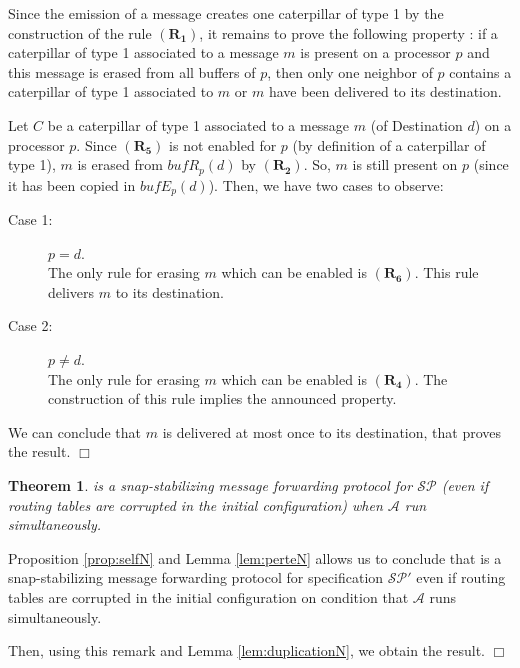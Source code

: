 \documentclass[11pt]{article}
\newtheorem{theorem}{Theorem}
\newenvironment{proof}{{\noindent\bf Proof. } }{{\hfill $\Box$}}
\begin{document}
\begin{proof}
Since the emission of a message creates one caterpillar of type 1 by the construction of the rule $\boldsymbol{(R_{1})}$, it remains to prove the following property : if a caterpillar of type 1 associated to a message $m$ is present on a processor $p$ and this message is erased from all buffers of $p$, then only one neighbor of $p$ contains a caterpillar of type 1 associated to $m$ or $m$ have been delivered to its destination.

Let $C$ be a caterpillar of type 1 associated to a message $m$ (of Destination $d$) on a processor $p$. Since $\boldsymbol{(R_{5})}$ is not enabled for $p$ (by definition of a caterpillar of type 1), $m$ is erased from $bufR_{p}(d)$ by $\boldsymbol{(R_{2})}$. So, $m$ is still present on $p$ (since it has been copied in $bufE_{p}(d)$). Then, we have two cases to observe:

\begin{description}
\item [Case 1:] $p=d$.\\
The only rule for erasing $m$ which can be enabled is $\boldsymbol{(R_{6})}$. This rule delivers $m$ to its destination.
\item [Case 2:] $p\neq d$.\\
The only rule for erasing $m$ which can be enabled is $\boldsymbol{(R_{4})}$. The construction of this rule implies the announced property.
\end{description}

We can conclude that $m$ is delivered at most once to its destination, that proves the result.
\end{proof}

\begin{theorem} \label{th:snapN}
\AN is a snap-stabilizing message forwarding protocol for $\mathcal{SP}$ (even if routing tables are corrupted in the initial configuration) when $\mathcal{A}$ run simultaneously.
\end{theorem}

\begin{proof}
Proposition \ref{prop:selfN} and Lemma \ref{lem:perteN} allows us to conclude that \AN is a snap-stabilizing message forwarding protocol for specification $\mathcal{SP}'$ even if routing tables are corrupted in the initial configuration on condition that $\mathcal{A}$ runs simultaneously.

Then, using this remark and Lemma \ref{lem:duplicationN}, we obtain the result.
\end{proof}
\end{document}
